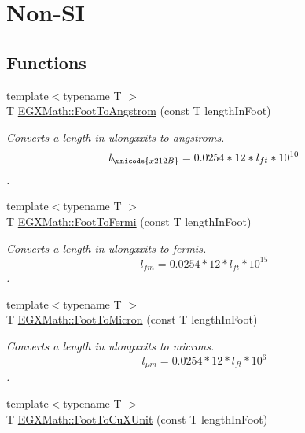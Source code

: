 \hypertarget{group___e_g_x_math-_conversions-_length_conversions-_imperial-_foot-_non-_s_i}{}\section{Non-\/\+SI}
\label{group___e_g_x_math-_conversions-_length_conversions-_imperial-_foot-_non-_s_i}
\subsection*{Functions}
\begin{DoxyCompactItemize}
\item 
{\footnotesize template$<$typename T $>$ }\\T \mbox{\hyperlink{group___e_g_x_math-_conversions-_length_conversions-_imperial-_foot-_non-_s_i_ga39b1712b38ad7c61cb859376f07decda}{E\+G\+X\+Math\+::\+Foot\+To\+Angstrom}} (const T length\+In\+Foot)
\begin{DoxyCompactList}\small\item\em Converts a length in ulongxxits to angstroms. \[ l_{\unicode{x212B}}=0.0254 * 12 * l_{ft} * 10^{10} \]. \end{DoxyCompactList}\item 
{\footnotesize template$<$typename T $>$ }\\T \mbox{\hyperlink{group___e_g_x_math-_conversions-_length_conversions-_imperial-_foot-_non-_s_i_gac61392c75e58e12f6a8a99aa765f22a0}{E\+G\+X\+Math\+::\+Foot\+To\+Fermi}} (const T length\+In\+Foot)
\begin{DoxyCompactList}\small\item\em Converts a length in ulongxxits to fermis. \[ l_{fm}=0.0254 * 12 * l_{ft} * 10^{15} \]. \end{DoxyCompactList}\item 
{\footnotesize template$<$typename T $>$ }\\T \mbox{\hyperlink{group___e_g_x_math-_conversions-_length_conversions-_imperial-_foot-_non-_s_i_ga0360d043c5150d90e61ad28c1fb81cc1}{E\+G\+X\+Math\+::\+Foot\+To\+Micron}} (const T length\+In\+Foot)
\begin{DoxyCompactList}\small\item\em Converts a length in ulongxxits to microns. \[ l_{\mu m}=0.0254 * 12 * l_{ft} * 10^{6} \]. \end{DoxyCompactList}\item 
{\footnotesize template$<$typename T $>$ }\\T \mbox{\hyperlink{group___e_g_x_math-_conversions-_length_conversions-_imperial-_foot-_non-_s_i_ga965e1b5a43bec32129d8319540036be1}{E\+G\+X\+Math\+::\+Foot\+To\+Cu\+X\+Unit}} (const T length\+In\+Foot)

\end{DoxyCompactItemize}
